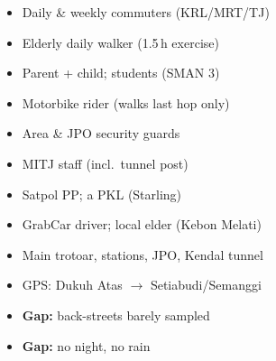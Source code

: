 \begin{tcbraster}[raster columns=3, raster equal height=rows, colback=white, colframe=soft,
  fonttitle=\bfseries\small, coltitle=ink, size=small, arc=2pt]
  \begin{tcolorbox}[title=Pedestrians]\footnotesize
    \begin{itemize}\item Daily \& weekly commuters (KRL/MRT/TJ)\item Elderly daily walker (1.5\,h exercise)
    \item Parent + child; students (SMAN 3)\item Motorbike rider (walks last hop only)\end{itemize}
  \end{tcolorbox}
  \begin{tcolorbox}[title=Workers of the corridor]\footnotesize
    \begin{itemize}\item Area \& JPO security guards\item MITJ staff (incl.\ tunnel post)
    \item Satpol PP; a PKL (Starling)\item GrabCar driver; local elder (Kebon Melati)\end{itemize}
  \end{tcolorbox}
  \begin{tcolorbox}[title=Where / when]\footnotesize
    \begin{itemize}\item Main trotoar, stations, JPO, Kendal tunnel\item GPS: Dukuh Atas $\to$ Setiabudi/Semanggi
    \item \textbf{Gap:} back-streets barely sampled\item \textbf{Gap:} no night, no rain\end{itemize}
  \end{tcolorbox}
\end{tcbraster}

